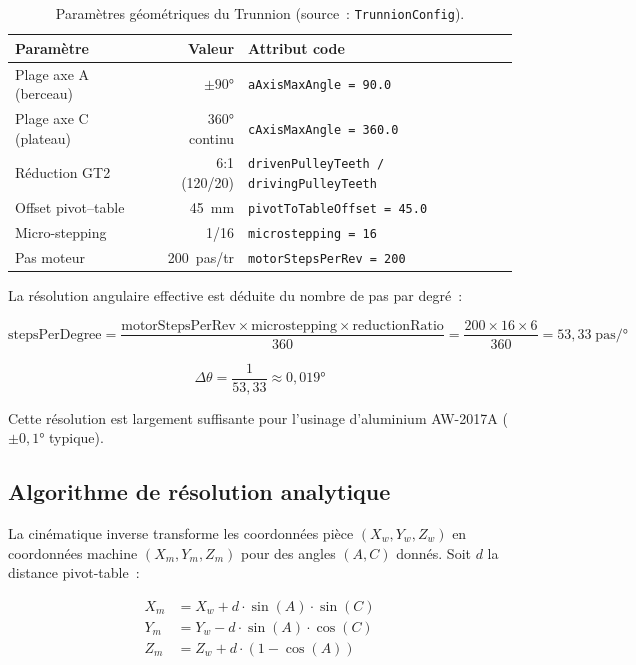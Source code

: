 \documentclass[12pt,a4paper]{report}
\newcommand{\code}[1]{\texttt{\small #1}}
\begin{document}
\begin{table}[H]
\centering
\caption{Paramètres géométriques du Trunnion (source~: \code{TrunnionConfig}).}
\label{tab:dh_params}
\begin{tabular}{l r l}
\toprule
Paramètre & Valeur & Attribut code \\
\midrule
Plage axe A (berceau) & $\pm 90°$ & \code{aAxisMaxAngle = 90.0} \\
Plage axe C (plateau) & $360°$ continu & \code{cAxisMaxAngle = 360.0} \\
Réduction GT2 & 6:1 (120/20) & \code{drivenPulleyTeeth / drivingPulleyTeeth} \\
Offset pivot--table & 45~mm & \code{pivotToTableOffset = 45.0} \\
Micro-stepping & 1/16 & \code{microstepping = 16} \\
Pas moteur & 200~pas/tr & \code{motorStepsPerRev = 200} \\
\bottomrule
\end{tabular}
\end{table}

La résolution angulaire effective est déduite du nombre de pas par degré~:

\begin{equation}
\text{stepsPerDegree} = \frac{\text{motorStepsPerRev} \times \text{microstepping} \times \text{reductionRatio}}{360} = \frac{200 \times 16 \times 6}{360} = 53{,}33 \;\text{pas/°}
\label{eq:steps_per_deg}
\end{equation}

\begin{equation}
\boxed{\Delta\theta = \frac{1}{53{,}33} \approx 0{,}019°}
\label{eq:angular_res}
\end{equation}

Cette résolution est largement suffisante pour l'usinage d'aluminium AW-2017A ($\pm 0{,}1°$ typique).

\subsection{Algorithme de résolution analytique}

La cinématique inverse transforme les coordonnées pièce $(X_w, Y_w, Z_w)$ en coordonnées machine $(X_m, Y_m, Z_m)$ pour des angles $(A, C)$ donnés. Soit $d$ la distance pivot-table~:

\begin{align}
X_m &= X_w + d \cdot \sin(A) \cdot \sin(C) \label{eq:kin_x} \\
Y_m &= Y_w - d \cdot \sin(A) \cdot \cos(C) \label{eq:kin_y} \\
Z_m &= Z_w + d \cdot (1 - \cos(A)) \label{eq:kin_z}
\end{align}
\end{document}
